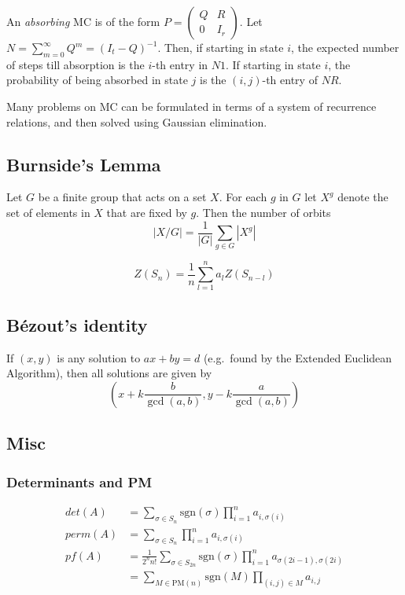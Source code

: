\documentclass[12pt,a4paper,landscape]{amsart}
\begin{document}
\begin{multicols*}{3}
An \textit{absorbing} MC is of the form $P = \left(\begin{matrix} Q & R
\\ 0 & I_r \end{matrix}\right)$. Let $N = \sum_{m=0}^\infty Q^m = (I_t
- Q)^{-1}$. Then, if starting in state $i$, the expected number of
steps till absorption is the $i$-th entry in $N1$. If starting in state
$i$, the probability of being absorbed in state $j$ is the $(i,j)$-th
entry of $NR$.

Many problems on MC can be formulated in terms of a system of
recurrence relations, and then solved using Gaussian elimination.

\subsection{Burnside's Lemma}
Let $G$ be a finite group that acts on a set $X$. For each $g$ in $G$
let $X^g$ denote the set of elements in $X$ that are fixed by $g$. Then
the number of orbits \[ |X/G| = \frac{1}{|G|} \sum_{g\in G} |X^g| \]

\[
Z(S_n) = \frac{1}{n} \sum_{l=1}^n a_l Z(S_{n-l})
\]

\subsection{Bézout's identity}
If $(x,y)$ is any solution to $ax+by=d$ (e.g.\ found by the Extended
Euclidean Algorithm), then all solutions are given by \[
\left(x+k\frac{b}{\gcd(a,b)}, y-k\frac{a}{\gcd(a,b)}\right) \]

\subsection{Misc}
\subsubsection{Determinants and PM}
\begin{align*}
det(A) &= \sum_{\sigma \in S_n}\text{sgn}(\sigma)\prod_{i = 1}^n a_{i,\sigma(i)}\\
perm(A) &= \sum_{\sigma \in S_n} \prod_{i = 1}^n a_{i,\sigma(i)}\\
pf(A) &= \frac{1}{2^nn!}\sum_{\sigma \in S_{2n}} \text{sgn}(\sigma)\prod_{i = 1}^n a_{\sigma(2i-1),\sigma(2i)}\\ &= \sum_{M \in \text{PM}(n)} \text{sgn}(M) \prod_{(i,j) \in M} a_{i,j}
\end{align*}


\end{multicols*}
\end{document}
